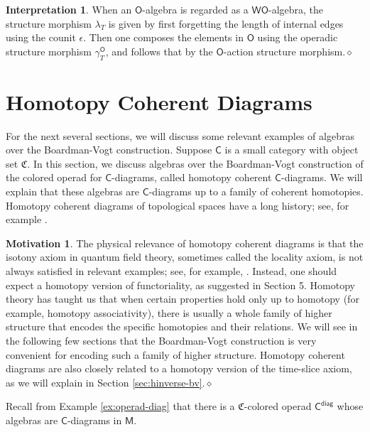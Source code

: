 \documentclass[11pt]{amsbook}
\numberwithin{section}{chapter}
\numberwithin{subsection}{section}
\numberwithin{equation}{section}
\theoremstyle{plain}
\theoremstyle{definition}
\newtheorem{interpretation}[equation]{Interpretation}
\newtheorem{motivation}[equation]{Motivation}
\newcommand{\colorc}{\mathfrak{C}}
\newcommand{\C}{\mathsf{C}}
\newcommand{\M}{\mathsf{M}}
\renewcommand{\O}{\mathsf{O}}
\newcommand{\W}{\mathsf{W}}
\newcommand{\dqed}{\hfill$\diamond$}
\newcommand{\gammao}{\gamma^{\O}}
\newcommand{\Cdiag}{\C^{\mathsf{diag}}}
\newcommand{\wo}{\W\O}
\begin{document}
\begin{interpretation}
When an $\O$-algebra is regarded as a $\wo$-algebra, the structure morphism $\lambda_T$ is given by first forgetting the length of internal edges using the counit $\epsilon$.  Then one composes the elements in $\O$ using the operadic structure morphism $\gammao_T$, and follows that by the $\O$-action structure morphism.\dqed\end{interpretation}


\section{Homotopy Coherent Diagrams}\label{sec:hcdiagram}

For the next several sections, we will discuss some relevant examples of algebras over the Boardman-Vogt construction. Suppose $\C$ is a small category with object set $\colorc$.  In this section, we discuss algebras over the Boardman-Vogt construction of the colored operad for $\C$-diagrams, called homotopy coherent $\C$-diagrams.  We will explain that these algebras are $\C$-diagrams up to a family of coherent homotopies.  Homotopy coherent diagrams of topological spaces have a long history; see, for example \cite{berger-moerdijk-resolution,cordier-porter,cordier-porter2,vogt73}.  

\begin{motivation}
The physical relevance of homotopy coherent diagrams is that the isotony axiom in quantum field theory, sometimes called the locality axiom, is not always satisfied in relevant examples; see, for example, \cite{bdhs,bss17}.  Instead, one should expect a homotopy version of functoriality, as suggested in \cite{bs17} Section 5.  Homotopy theory has taught us that when certain properties hold only up to homotopy (for example, homotopy associativity), there is usually a whole family of higher structure that encodes the specific homotopies and their relations.  We will see in the following few sections that the Boardman-Vogt construction is very convenient for encoding such a family of higher structure.  Homotopy coherent diagrams are also closely related to a homotopy version of the time-slice axiom, as we will explain in Section \ref{sec:hinverse-bv}.\dqed  
\end{motivation}

Recall from Example \ref{ex:operad-diag} that there is a $\colorc$-colored operad $\Cdiag$ whose algebras are $\C$-diagrams in $\M$.
\end{document}
